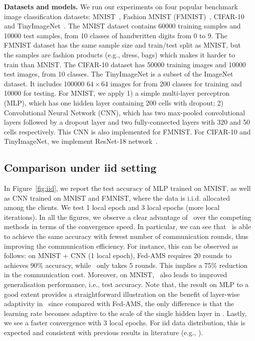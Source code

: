 \documentclass[manuscript,screen,review]{acmart}
\begin{document}
\vspace{0.1in}
\noindent\textbf{Datasets and models.} We run our experiments on four popular benchmark image classification datasets: MNIST~\citep{lecun1998mnist}, Fashion MNIST (FMNIST)~\citep{xiao2017fashion}, CIFAR-10~\citep{krizhevsky2009learning} and TinyImageNet~\citep{deng2009imagenet}. The MNIST dataset contains 60000 training samples and 10000 test samples, from 10 classes of handwritten digits from 0 to 9. The FMNIST dataset has the same sample size and train/test split as MNIST, but the samples are fashion products (e.g., dress, bags) which makes it harder to train than MNIST. The CIFAR-10 dataset has 50000 training images and 10000 test images, from 10 classes. The TinyImageNet is a subset of the ImageNet dataset. It includes 100000 $64\times 64$ images for from 200 classes for training and 10000 for testing. For MNIST, we apply 1) a simple multi-layer perceptron (MLP), which has one hidden layer containing 200 cells with dropout; 2) Convolutional Neural Network (CNN), which has two max-pooled convolutional layers followed by a dropout layer and two fully-connected layers with 320 and 50 cells respectively. This CNN is also implemented for FMNIST. For CIFAR-10 and TinyImageNet, we implement ResNet-18 network~\cite{Proc:He-resnet16}.


\subsection{Comparison under iid setting}

In Figure~\ref{fig:iid}, we report the test accuracy of MLP trained on MNIST, as well as CNN trained on MNIST and FMNIST, where the data is i.i.d. allocated among the clients. We test 1 local epoch and 3 local epochs (more local iterations). In all the figures, we observe a clear advantage of \algo\ over the competing methods in terms of the convergence speed. In particular, we can see that \algo\ is able to achieve the same accuracy with fewest number of communication rounds, thus improving the communication efficiency. For instance, this can be observed as follows: on MNIST + CNN (1 local epoch), Fed-AMS requires 20 rounds to achieves 90\% accuracy, while \algo\ only takes 5 rounds. This implies a 75\% reduction in the communication cost. Moreover, on MNIST, \algo\ also leads to improved generalisation performance, i.e., test accuracy. Note that, the result on MLP to a good extent provides a straightforward illustration on the benefit of layer-wise adaptivity in \algo\, since compared with Fed-AMS, the only difference is that the learning rate becomes adaptive to the scale of the single hidden layer in \algo. Lastly, we see a faster convergence with 3 local epochs. For iid data distribution, this is expected and consistent with previous results in literature (e.g., \cite{reddi2020adaptive}).
\end{document}
